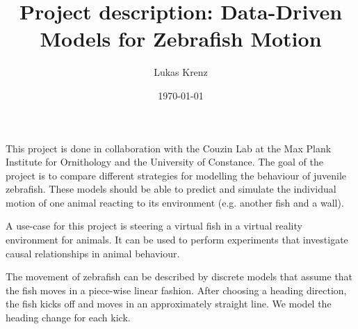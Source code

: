 \documentclass[11pt]{article}
\author{Lukas Krenz}
\date{\today}
\title{Project description: Data-Driven Models for Zebrafish Motion}
\begin{document}
\maketitle

This project is done in collaboration with the Couzin Lab at the Max Plank Institute for Ornithology and the University of Constance.
The goal of the project is to compare different strategies for modelling the behaviour of juvenile zebrafish.
These models should be able to predict and simulate the individual motion of one animal reacting to its environment (e.g. another fish and a wall).

A use-case for this project is steering a virtual fish in a virtual reality environment for animals.
It can be used to perform experiments that investigate causal relationships in animal behaviour.

The movement of zebrafish can be described by discrete models that assume that the fish moves in a piece-wise linear fashion.
After choosing a heading direction, the fish kicks off and moves in an approximately straight line.
We model the heading change for each kick.
\end{document}
